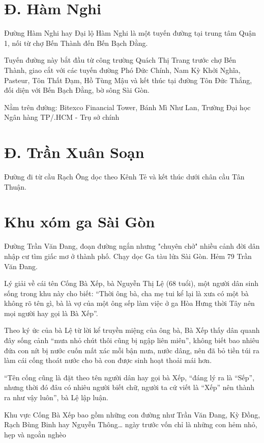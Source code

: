 \section{Đ. Hàm Nghi}

Đường Hàm Nghi hay Đại lộ Hàm Nghi là một tuyến đường tại trung tâm Quận 1, nối từ chợ Bến Thành đến Bến Bạch Đằng.

Tuyến đường này bắt đầu từ công trường Quách Thị Trang trước chợ Bến Thành, giao cắt với các tuyến đường Phó Đức Chính, Nam Kỳ Khởi Nghĩa, Pasteur, Tôn Thất Đạm, Hồ Tùng Mậu và kết thúc tại đường Tôn Đức Thắng, đối diện với Bến Bạch Đằng, bờ sông Sài Gòn.

Nằm trên đường: Bitexco Financial Tower, Bánh Mì Như Lan, Trường Đại học Ngân hàng TP/.HCM - Trụ sở chính

\section{Đ. Trần Xuân Soạn}

Đường đi từ cầu Rạch Ông dọc theo Kênh Tẻ và kết thúc dưới chân cầu Tân Thuận.

\section{Khu xóm ga Sài Gòn}

Đường Trần Văn Đang, đoạn đường ngắn nhưng "chuyên chở" nhiều cảnh đời dân nhập cư tìm giấc mơ ở thành phố. Chạy dọc Ga tàu lửa Sài Gòn. Hẻm 79 Trần Văn Đang.

Lý giải về cái tên Cống Bà Xếp, bà Nguyễn Thị Lệ (68 tuổi), một người dân sinh sống trong khu này cho biết: “Thời ông bà, cha mẹ tui kể lại là xưa có một bà không rõ tên gì, bà là vợ của một ông sếp làm việc ở ga Hòa Hưng thời Tây nên mọi người hay gọi là Bà Xếp”.

Theo ký ức của bà Lệ từ lời kể truyền miệng của ông bà, Bà Xếp thấy dân quanh đây sống cảnh “mưa nhỏ chút thôi cũng bị ngập liên miên”, không biết bao nhiêu đứa con nít bị nước cuốn mất xác mỗi bận mưa, nước dâng, nên đã bỏ tiền túi ra làm cái cống thoát nước cho bà con được sinh hoạt thoải mái hơn.

“Tên cống cũng là đặt theo tên người dân hay gọi bà Xếp, “đáng lý ra là “Sếp”, nhưng thời đó đâu có nhiêu người biết chữ, người ta cứ viết là “Xếp” nên thành ra như vậy luôn”, bà Lệ lập luận.

Khu vực Cống Bà Xếp bao gồm những con đường như Trần Văn Đang, Kỳ Đồng, Rạch Bùng Binh hay Nguyễn Thông… ngày trước vốn chỉ là những con hẻm nhỏ, hẹp và ngoằn nghèo

